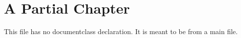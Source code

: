 \section{A Partial Chapter}

This file has no documentclass declaration.
It is meant to be  from a main file.